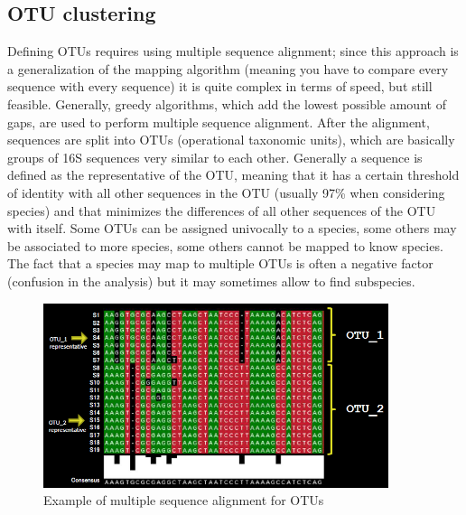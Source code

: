   \subsection{OTU clustering}
    Defining OTUs requires using multiple sequence alignment; since this approach is a generalization of the mapping algorithm (meaning you have to compare every sequence with every sequence) it is quite complex in terms of speed, but still feasible. Generally, greedy algorithms, which add the lowest possible amount of gaps, are used to perform multiple sequence alignment. After the alignment, sequences are split into OTUs (operational taxonomic units), which are basically groups of 16S sequences very similar to each other. Generally a sequence is defined as the representative of the OTU, meaning that it has a certain threshold of identity with all other sequences in the OTU (usually 97\% when considering species) and that minimizes the differences of all other sequences of the OTU with itself. Some OTUs can be assigned univocally to a species, some others may be associated to more species, some others cannot be mapped to know species. The fact that a species may map to multiple OTUs is often a negative factor (confusion in the analysis) but it may sometimes allow to find subspecies.
    \begin{figure}[!h]
      \centering
      \includegraphics[width=0.9\textwidth]{OTU_general.png}
      \caption{\label{fig:OTU_general}Example of multiple sequence alignment for OTUs}
    \end{figure}


